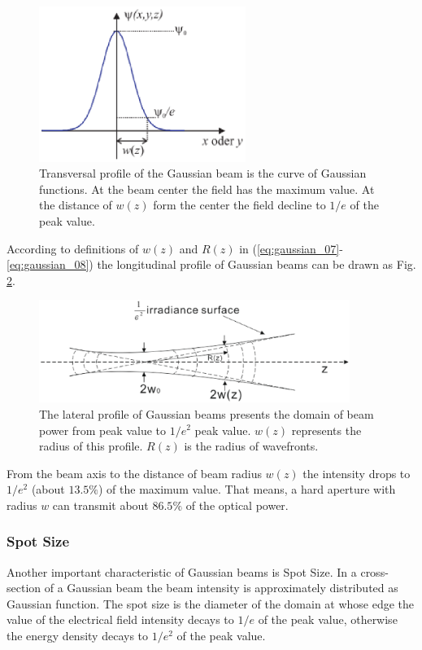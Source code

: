 \begin{figure}[!ht]
\centering
\includegraphics[width=0.6\textwidth]{bilder/gussian_verteilung}
\caption{Transversal profile of the Gaussian beam is the curve of Gaussian functions. At the beam center the field has the maximum value. At the distance of $w(z)$ form the center the field decline to $1/e$ of the peak value.}
\label{fig:gaussian_verteilung}
\end{figure}
According to definitions of $w(z)$ and $R(z)$ in (\ref{eq:gaussian_07}-\ref{eq:gaussian_08}) the longitudinal profile of Gaussian beams can be drawn as Fig. \ref{fig:gussian_profile}.
\begin{figure}[!ht]
\centering
\includegraphics[width=0.9\textwidth]{bilder/gussian_profile}
\caption{The lateral profile of Gaussian beams presents the domain of beam power from peak value to $1/e^2$ peak value. $w(z)$ represents the radius of this profile. $R(z)$ is the radius of wavefronts.}
\label{fig:gussian_profile}
\end{figure}
From the beam axis to the distance of beam radius $w(z)$ the intensity drops to $1/e^{2}$ (about $ 13.5\%$) of the maximum value. That means, a hard aperture with radius $w$ can transmit about $86.5\%$ of the optical power.

\subsubsection*{Spot Size}
Another important characteristic of Gaussian beams is Spot Size. In a cross-section of a Gaussian beam the beam intensity is approximately distributed as Gaussian function. The spot size is the diameter of the domain at whose edge the value of the electrical field intensity decays to $1/e$ of the peak value, otherwise the energy density decays to $1/e^2$ of the peak value.
